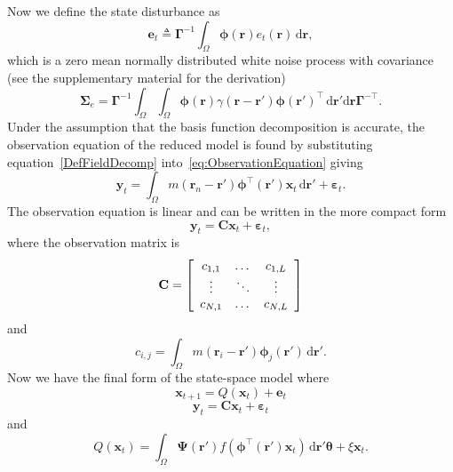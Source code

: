 \documentclass[12pt]{iopart}
\begin{document}
Now we define the state disturbance as
\begin{equation}\label{eq:Wt} 
	\mathbf{e}_t \triangleq \boldsymbol{\Gamma}^{-1}\int_\Omega {\boldsymbol{\phi} ( \mathbf{r} )e_t( \mathbf{r} ) \, \textrm{d}\mathbf{r}},
\end{equation}
which is a zero mean normally distributed white noise process with covariance (see the supplementary material for the derivation)
\begin{equation}
	\boldsymbol\Sigma_e =\mathbf{\Gamma}^{-1}\int_{\Omega}\int_{\Omega}\boldsymbol{\phi}\left(\mathbf r\right) \gamma\left(\mathbf r- \mathbf r' \right)\boldsymbol{\phi}\left(\mathbf r'\right)^{\top} \, \mathrm{d}\mathbf r' \mathrm{d}\mathbf r\mathbf{\Gamma}^{- \top}. 
\end{equation}
Under the assumption that the basis function decomposition is accurate, the observation equation of the reduced model is found by substituting equation~\ref{DefFieldDecomp} into~\ref{eq:ObservationEquation} giving
\begin{equation}\label{eq:ReducedObservationEquation}
	\mathbf{y}_t = \int_{\Omega}{m\left(\mathbf{r}_n-\mathbf{r}'\right)\boldsymbol{\phi}^{\top}\left(\mathbf{r'}\right) \mathbf{x}_t\, \textrm{d}\mathbf{r}'} + \boldsymbol{\varepsilon}_t. 
\end{equation}
The observation equation is linear and can be written in the more compact form
\begin{equation}\label{ObservationEquation} 
	\mathbf{y}_t = \mathbf{C}\mathbf{x}_t + \boldsymbol{\varepsilon}_t,
\end{equation}
where the observation matrix is 
\begin{equation}
	\mathbf{C} = \left[
	\begin{array}{{ccc}} 
		c_{1,1} & \dots & c_{1,L} \\
		\vdots & \ddots & \vdots \\
		c_{N,1} & \dots & c_{N,L} 
	\end{array}
	\right] 
\end{equation}
and 
\begin{equation}
	c_{i,j} = \int_{\Omega}m(\mathbf{r}_i - \mathbf{r}')\boldsymbol{\phi}_j(\mathbf{r}') \, \textrm{d}\mathbf{r}'. 
\end{equation}
Now we have the final form of the state-space model where
\begin{equation}\label{eq:finalformstatespacemodel}
	\mathbf{x}_{t+1} = Q(\mathbf{x}_t) +\mathbf{e}_t
\end{equation}
\begin{equation} 
	\mathbf{y}_t = \mathbf{C}\mathbf{x}_t + \boldsymbol{\varepsilon}_t
\end{equation}
and 
\begin{equation}\label{eq:QmatrixForSigmapoints}
	Q(\mathbf{x}_t) = \int_\Omega \boldsymbol{\Psi}(\mathbf{r}') f(\boldsymbol{\phi}^{\top}(\mathbf{r}')\mathbf{x}_t) \, \textrm{d}\mathbf{r}' \boldsymbol{\theta} + \xi\mathbf{x}_t.
\end{equation}
\end{document}
